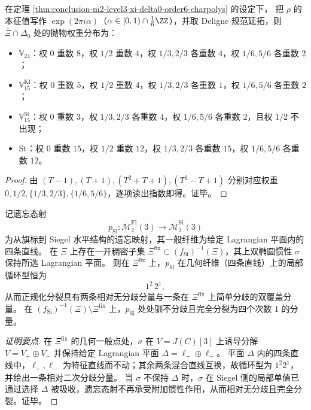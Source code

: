 \begin{corollary}\label{cor:conclusion-m2-level3-xi-delta0-order6-parabolic-spectrum}
在定理 \ref{thm:conclusion-m2-level3-xi-delta0-order6-charpolys} 的设定下，
把 \(\rho\) 的本征值写作 \(\exp(2\pi i\alpha)\)（\(\alpha\in[0,1)\cap\frac16\ZZ\)），并取 Deligne 规范延拓，则 \(\overline{\Xi}\cap\Delta_0\) 处的抛物权重分布为：
\begin{itemize}
  \item \(\mathbb V_{24}\)：权 \(0\) 重数 \(8\)，权 \(1/2\) 重数 \(4\)，权 \(1/3,2/3\) 各重数 \(4\)，权 \(1/6,5/6\) 各重数 \(2\)；
  \item \(\mathbb V_{15}^{\mathrm{Kl}}\)：权 \(0\) 重数 \(5\)，权 \(1/2\) 重数 \(4\)，权 \(1/3,2/3\) 各重数 \(1\)，权 \(1/6,5/6\) 各重数 \(2\)；
  \item \(\mathbb V_{15}^{\mathrm{Si}}\)：权 \(0\) 重数 \(3\)，权 \(1/3,2/3\) 各重数 \(4\)，权 \(1/6,5/6\) 各重数 \(2\)，且权 \(1/2\) 不出现；
  \item \(\mathrm{St}\)：权 \(0\) 重数 \(15\)，权 \(1/2\) 重数 \(12\)，权 \(1/3,2/3\) 各重数 \(15\)，权 \(1/6,5/6\) 各重数 \(12\)。
\end{itemize}
\end{corollary}
\begin{proof}
由 \((T-1),(T+1),(T^2+T+1),(T^2-T+1)\) 分别对应权重 \(0,1/2,\{1/3,2/3\},\{1/6,5/6\}\)，逐项读出指数即得。证毕。
\end{proof}

\begin{theorem}\label{thm:conclusion-m2-level3-forgetful-over-xi-splitting-ramification}
记遗忘态射
\[
p_{\mathrm{Si}}:\overline{\mathcal M}_2^{\mathrm{Fl}}(3)\longrightarrow \overline{\mathcal M}_2^{\mathrm{Si}}(3)
\]
为从旗标到 Siegel 水平结构的遗忘映射，其一般纤维为给定 Lagrangian 平面内的四条直线。
在 \(\Xi\) 上存在一开稠密子集 \(\Xi^{\mathrm{fix}}\subset (f_{\mathrm{Si}})^{-1}(\Xi)\)，其上双椭圆惯性 \(\sigma\) 保持所选 Lagrangian 平面。
则在 \(\Xi^{\mathrm{fix}}\) 上，\(p_{\mathrm{Si}}\) 在几何纤维（四条直线）上的局部循环型恒为
\[
1^{2}\,2^{1},
\]
从而正规化分裂具有两条相对无分歧分量与一条在 \(\Xi^{\mathrm{fix}}\) 上简单分歧的双覆盖分量。
在 \((f_{\mathrm{Si}})^{-1}(\Xi)\setminus \Xi^{\mathrm{fix}}\) 上，\(p_{\mathrm{Si}}\) 处处驯不分歧且完全分裂为四个次数 \(1\) 的分量。
\end{theorem}
\begin{proof}[证明要点]
在 \(\Xi^{\mathrm{fix}}\) 的几何一般点处，\(\sigma\) 在 \(V=J(C)[3]\) 上诱导分解 \(V=V_+\oplus V_-\) 并保持给定 Lagrangian 平面 \(\Delta=\ell_+\oplus \ell_-\)。
平面 \(\Delta\) 内的四条直线中，\(\ell_+,\ell_-\) 为特征直线而不动；其余两条混合直线互换，故循环型为 \(1^2 2^1\)，并给出一条相对二次分歧分量。
当 \(\sigma\) 不保持 \(\Delta\) 时，\(\sigma\) 在 Siegel 侧的局部单值已通过选择 \(\Delta\) 被吸收，遗忘态射不再承受附加惯性作用，从而相对无分歧且完全分裂。证毕。
\end{proof}


